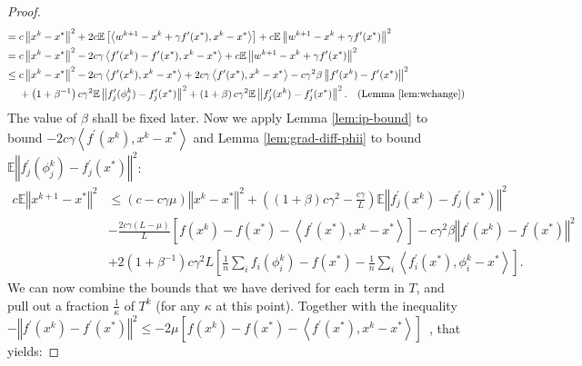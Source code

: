 \documentclass{article}
\newcommand{\stepsize}{\gamma} %
\begin{document}
\begin{proof}
\begin{align*}
 = {} &  c\left\Vert x^k-x^{*}\right\Vert ^{2}+2c\mathbb{E}\left[\left\langle w^{k+1}-x^k+\stepsize f^{\prime}(x^{*}),x^k-x^{*}\right\rangle \right]+c\mathbb{E}\left\Vert w^{k+1}-x^k+\stepsize f^{\prime}(x^{*})\right\Vert ^{2}\\
 = {} &  c\left\Vert x^k-x^{*}\right\Vert ^{2}-2c\stepsize\left\langle f^{\prime}(x^k)-f^{\prime}(x^{*}),x^k-x^{*}\right\rangle +c\mathbb{E}\left\Vert w^{k+1}-x^k+\stepsize f^{\prime}(x^{*})\right\Vert ^{2}\\
 \leq {} &  c\left\Vert x^k-x^{*}\right\Vert ^{2}-2c\stepsize\left\langle f^{\prime}(x^k),x^k-x^{*}\right\rangle +2c \stepsize \left\langle f^{\prime}(x^{*}),x^k-x^{*}\right\rangle 
 - c \stepsize^{2} \beta \left\Vert f^{\prime}(x^k)-f^{\prime}(x^{*}) \right\Vert ^{2}\\
 &   +\left(1+\beta^{-1}\right)c \stepsize^{2}\mathbb{E}\left\Vert f_{j}^{\prime}(\phi_{j}^{k})-f_{j}^{\prime}(x^{*})\right\Vert ^{2}+\left(1+\beta\right)c \stepsize^{2}\mathbb{E}\left\Vert f_{j}^{\prime}(x^k)-f_{j}^{\prime}(x^{*})\right\Vert ^{2}.\quad\text{(Lemma \ref{lem:wchange})}
\end{align*}
The value of $\beta$ shall be fixed later. Now we apply Lemma \ref{lem:ip-bound} to bound $-2c\stepsize\left\langle f^{\prime}(x^k),x^k-x^{*}\right\rangle $ and Lemma \ref{lem:grad-diff-phii} to bound $\mathbb{E}\left\Vert f_{j}^{\prime}(\phi_{j}^{k})-f_{j}^{\prime}(x^{*})\right\Vert ^{2}$:
\begin{align*}
c\mathbb{E}\left\Vert x^{k+1}-x^{*}\right\Vert ^{2} &\leq \left(c-c\stepsize\mu \right)\left\Vert x^k-x^{*}\right\Vert ^{2}+\left((1+\beta)c\stepsize^{2}-\frac{c\stepsize }{L}\right)\mathbb{E}\left\Vert f_{j}^{\prime}(x^k)-f_{j}^{\prime}(x^{*})\right\Vert ^{2}\\
  & -\frac{2c\stepsize(L-\mu)}{L}\left[f(x^k)-f(x^{*})-\left\langle f^{\prime}(x^{*}),x^k-x^{*}\right\rangle \right]
      - c\stepsize^{2}\beta\left\Vert f^{\prime}(x^k)-f^{\prime}(x^{*}) \right\Vert ^{2} \\
 &   +2\left(1+\beta^{-1}\right)c\stepsize^2 L\left[\frac{1}{n}\sum_{i}f_{i}(\phi_{i}^{k})-f(x^{*})-\frac{1}{n}\sum_{i}\left\langle f_{i}^{\prime}(x^{*}),\phi_{i}^{k}-x^{*}\right\rangle \right].
\end{align*}
We can now combine the bounds that we have derived for each term in $T$,
and pull out a fraction $\frac{1}{\kappa}$ of $T^{k}$ (for any $\kappa$ at this point). Together with the inequality 
$-\left\Vert f^{\prime}(x^k)-f^{\prime}(x^{*})\right\Vert ^{2}\leq-2\mu\left[f(x^k)-f(x^{*})-\left\langle f^{\prime}(x^{*}),x^k-x^{*}\right\rangle \right]$~\cite[Thm. 2.1.10]{nes-book}, that yields:

\end{proof}
\end{document}

